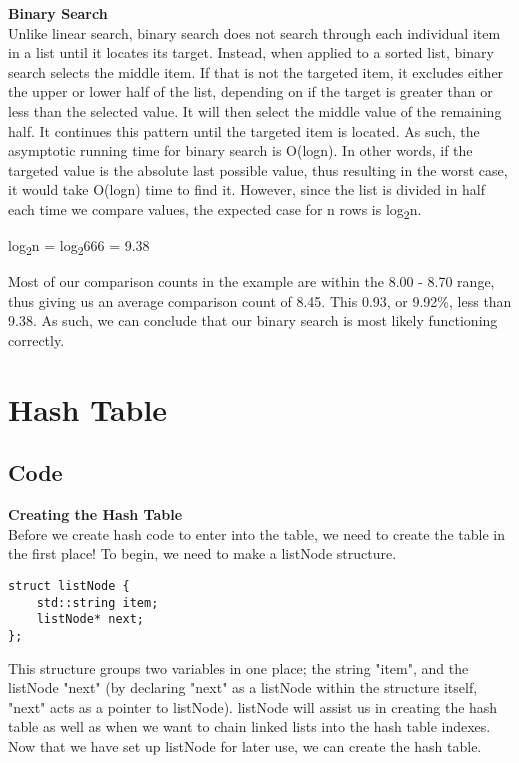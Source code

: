 \documentclass{article}
\begin{document}
\textbf{Binary Search} \\
Unlike linear search, binary search does not search through each individual item in a list until it locates its target. Instead, when applied to a sorted list, binary search selects the middle item. If that is not the targeted item, it excludes either the upper or lower half of the list, depending on if the target is greater than or less than the selected value. It will then select the middle value of the remaining half. It continues this pattern until the targeted item is located. As such, the asymptotic running time for binary search is O(logn). In other words, if the targeted value is the absolute last possible value, thus resulting in the worst case, it would take O(logn) time to find it. However, since the list is divided in half each time we compare values, the expected case for n rows is log\textsubscript{2}n.
\begin{center}
    log\textsubscript{2}n = log\textsubscript{2}666 = 9.38
\end{center}
Most of our comparison counts in the example are within the 8.00 - 8.70 range, thus giving us an average comparison count of 8.45. This 0.93, or 9.92\%, less than 9.38. As such, we can conclude that our binary search is most likely functioning correctly. 

\pagebreak
\section{Hash Table}
\subsection{Code}
\textbf{Creating the Hash Table} \\
Before we create hash code to enter into the table, we need to create the table in the first place! To begin, we need to make a listNode structure.

\begin{lstlisting}
struct listNode {
    std::string item;
    listNode* next;
};
\end{lstlisting}

This structure groups two variables in one place; the string "item", and the listNode "next" (by declaring "next" as a listNode within the structure itself, "next" acts as a pointer to listNode). listNode will assist us in creating the hash table as well as when we want to chain linked lists into the hash table indexes.\\
Now that we have set up listNode for later use, we can create the hash table.
\end{document}
